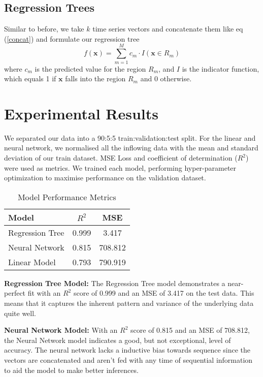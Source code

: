 \documentclass[12pt,a4paper]{article}
\begin{document}
\subsection{Regression Trees}
Similar to before, we take $k$ time series vectors and concatenate them like eq (\ref{concat}) and formulate our regression tree
\begin{equation}
f(\mathbf{x}) = \sum_{m=1}^{M} c_m \cdot I(\mathbf{x} \in R_m)
\end{equation}
where \( c_m \) is the predicted value for the region \( R_m \), and \( I \) is the indicator function, which equals 1 if \( \mathbf{x} \) falls into the region \( R_m \) and 0 otherwise.

\section{Experimental Results}
We separated our data into a 90:5:5 train:validation:test split. For the linear and neural network, we normalised all the inflowing data with the mean and standard deviation of our train dataset. MSE Loss and coefficient of determination ($R^2$) were used as metrics. We trained each model, performing hyper-parameter optimization to maximise performance on the validation dataset.

\begin{table}[ht]
\centering
\begin{tabular}{@{}lcc@{}}
\toprule
Model             & \( R^2 \) & MSE      \\ \midrule
Regression Tree   & 0.999     & 3.417    \\
Neural Network    & 0.815     & 708.812  \\
Linear Model      & 0.793     & 790.919  \\ \bottomrule
\end{tabular}
\caption{Model Performance Metrics}
\label{tab:model_metrics}
\end{table}

\textbf{Regression Tree Model:}
The Regression Tree model demonstrates a near-perfect fit with an \( R^2 \) score of 0.999 and an MSE of 3.417 on the test data. This means that it captures the inherent pattern and variance of the underlying data quite well.

\textbf{Neural Network Model:}
With an \( R^2 \) score of 0.815 and an MSE of 708.812, the Neural Network model indicates a good, but not exceptional, level of accuracy. The neural network lacks a inductive bias towards sequence since the vectors are concatenated and aren't fed with any time of sequential information to aid the model to make better inferences.
\end{document}
